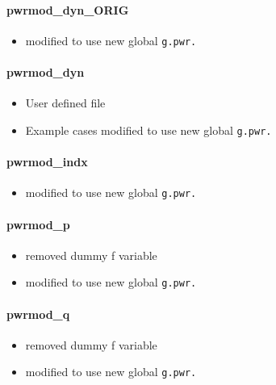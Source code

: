 \documentclass[12pt]{article}
\begin{document}
\paragraph{pwrmod\_dyn\_ORIG}
	\begin{itemize}
		\item modified to use new global \verb|g.pwr.|
	\end{itemize}
\paragraph{pwrmod\_dyn}
	\begin{itemize}
		\item User defined file
		\item Example cases modified to use new global \verb|g.pwr.|
	\end{itemize}
	
\paragraph{pwrmod\_indx}
	\begin{itemize}
		\item modified to use new global \verb|g.pwr.|
	\end{itemize}
\paragraph{pwrmod\_p}
	\begin{itemize}
		\item removed dummy f variable
		\item modified to use new global \verb|g.pwr.|
	\end{itemize}
\paragraph{pwrmod\_q}
	\begin{itemize}
		\item removed dummy f variable
		\item modified to use new global \verb|g.pwr.|
	\end{itemize}
\end{document}
